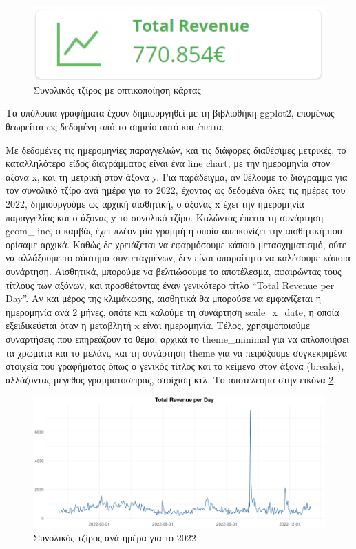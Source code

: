 \documentclass{article}
\begin{document}
\begin{figure}[h]
    \centering
    \includegraphics[width=\textwidth]{pictures/1_card_graph.png}
    \caption{Συνολικός τζίρος με οπτικοποίηση κάρτας}
    \label{fig:1}
\end{figure}

Τα υπόλοιπα γραφήματα έχουν δημιουργηθεί με τη βιβλιοθήκη ggplot2, επομένως θεωρείται ως δεδομένη από το σημείο αυτό και έπειτα. 

Με δεδομένες τις ημερομηνίες παραγγελιών, και τις διάφορες διαθέσιμες μετρικές, το καταλληλότερο είδος διαγράμματος είναι ένα line chart, με την ημερομηνία στον άξονα x, και τη μετρική στον άξονα y. Για παράδειγμα, αν θέλουμε το διάγραμμα για τον συνολικό τζίρο ανά ημέρα για το 2022, έχοντας ως δεδομένα όλες τις ημέρες του 2022, δημιουργούμε ως αρχική αισθητική, ο άξονας x έχει την ημερομηνία παραγγελίας και ο άξονας y το συνολικό τζίρο. Καλώντας έπειτα τη συνάρτηση geom\_line, ο καμβάς έχει πλέον μία γραμμή η οποία απεικονίζει την αισθητική που ορίσαμε αρχικά. Καθώς δε χρειάζεται να εφαρμόσουμε κάποιο μετασχηματισμό, ούτε να αλλάξουμε το σύστημα συντεταγμένων, δεν είναι απαραίτητο να καλέσουμε κάποια συνάρτηση. Αισθητικά, μπορούμε να βελτιώσουμε το αποτέλεσμα, αφαιρώντας τους τίτλους των αξόνων, και προσθέτοντας έναν γενικότερο τίτλο “Total Revenue per Day”. Αν και μέρος της κλιμάκωσης, αισθητικά θα μπορούσε να εμφανίζεται η ημερομηνία ανά 2 μήνες, οπότε και καλούμε τη συνάρτηση scale\_x\_date, η οποία εξειδικεύεται όταν η μεταβλητή x είναι ημερομηνία. Τέλος, χρησιμοποιούμε συναρτήσεις που επηρεάζουν το θέμα, αρχικά το theme\_minimal για να απλοποιήσει τα χρώματα και το μελάνι, και τη συνάρτηση theme για να πειράξουμε συγκεκριμένα στοιχεία του γραφήματος όπως ο γενικός τίτλος και το κείμενο στον άξονα (breaks), αλλάζοντας μέγεθος γραμματοσειράς, στοίχιση κτλ. Το αποτέλεσμα στην εικόνα \ref{fig:2}.

\begin{figure}[h]
    \centering
    \includegraphics[width=\textwidth]{pictures/2_timeline_graph.png}
    \caption{Συνολικός τζίρος ανά ημέρα για το 2022}
    \label{fig:2}
\end{figure}
\end{document}
